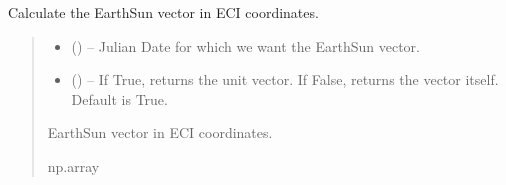 \documentclass[letterpaper,10pt,english]{sphinxmanual}
\begin{document}

\begin{fulllineitems}
\label{\detokenize{fspsim.utils:fspsim.utils.Conversions.earth_sun_vec}}
\pysigstartsignatures
{}
\pysigstopsignatures
\sphinxAtStartPar
Calculate the Earth\sphinxhyphen{}Sun vector in ECI coordinates.
\begin{quote}\begin{description}
\begin{itemize}
\item {} 
\sphinxAtStartPar
{} () – Julian Date for which we want the Earth\sphinxhyphen{}Sun vector.

\item {} 
\sphinxAtStartPar
{} () – If True, returns the unit vector. If False, returns the vector itself. Default is True.

\end{itemize}

\sphinxAtStartPar
Earth\sphinxhyphen{}Sun vector in ECI coordinates.

\sphinxAtStartPar
np.array

\end{description}\end{quote}

\end{fulllineitems}

\end{document}
